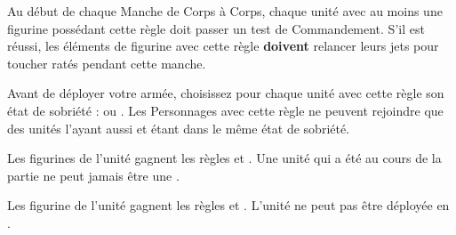 \newcommand{\smashrule}{%
Choisissez une figurine en contact socle à socle avec le Géant dans l'unité sélectionnée. Cette figurine subit une blessure avec \armourpiercing{6}. Si la figurine n'a pas encore attaqué, elle ne peut pas le faire au cours de cette manche. Si la figurine a déjà réalisé ses attaques, elle ne pourra pas attaquer au cours du Tour de Joueur à venir.
}


\newcommand{\QRSnote}{%
\noindent\refsymbol{} Perd le \longhorn{} quand utilisé en monture de Personnage.
}











\startarmyspecialrules

\armyspecialruleentry{\primalinstinct}

Au début de chaque Manche de Corps à Corps, chaque unité avec au moins une figurine possédant cette règle doit passer un test de Commandement. S'il est réussi, les éléments de figurine avec cette règle \textbf{doivent} relancer leurs jets pour toucher ratés pendant cette manche.

\armyspecialruleentry{\drunkard}

Avant de déployer votre armée, choisissez pour chaque unité avec cette règle son état de sobriété : \sober{} ou \drunk{}. Les Personnages avec cette règle ne peuvent rejoindre que des unités l'ayant aussi et étant dans le même état de sobriété.
\begin{multicols}{2}
	\raggedcolumns
	\begin{center}{\Largerfontsize\antiquefont\sober{}}\end{center}
	\vspace{5pt}
	\textit{}\vspace{3pt}\newline
	Les figurines de l'unité gagnent les règles \vanguard{} et \lighttroops{}. Une unité qui a été \sober{} au cours de la partie ne peut jamais être une \scoringunit{}.

	\vspace*{\fill}
	\columnbreak
	\begin{center}{\Largerfontsize\antiquefont\drunk{}}\end{center}
	\vspace{5pt}
	\textit{}\vspace{3pt}\newline
	Les figurine de l'unité gagnent les règles \thunderouscharge{} et \immunetopsychology{}. L'unité ne peut pas être déployée en \ambush{}.

	\vspace*{\fill}
\end{multicols}

